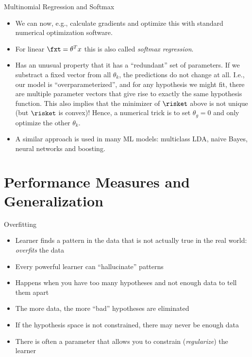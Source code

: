 \begin{vbframe}{Multinomial Regression and Softmax}
\begin{itemize}
\item We can now, e.g., calculate gradients and optimize this with standard numerical optimization software.

\item For linear $\fxt = \theta^T x$ this is also called \emph{softmax regression}.

\item Has an unusual property that it has a \enquote{redundant} set of parameters. If we substract a fixed vector
  from all $\theta_k$, the predictions do not change at all.
  I.e.,  our model is \enquote{overparameterized}, and for any hypothesis we might fit,
  there are multiple parameter vectors that give rise to exactly the same hypothesis function.
  This also implies that the minimizer of $\risket$ above is not unique (but $\risket$ is convex)!
  Hence, a numerical trick is to set $\theta_g = 0$ and only optimize the other $\theta_k$.

\item A similar approach is used in many ML models: multiclass LDA, naive Bayes, neural networks and boosting.

\end{itemize}

\end{vbframe}






\section{Performance Measures and Generalization}

\begin{frame}{Overfitting}

\begin{itemize}
\item
  Learner finds a pattern in the data that is not actually true in the
  real world: \emph{overfits} the data
\item
  Every powerful learner can \enquote{hallucinate} patterns
\item
  Happens when you have too many hypotheses and not enough data to tell
  them apart
\item
  The more data, the more \enquote{bad} hypotheses are eliminated
\item
  If the hypothesis space is not constrained, there may never be enough
  data
\item
  There is often a parameter that allows you to constrain
  (\emph{regularize}) the learner
\end{itemize}

\end{frame}

